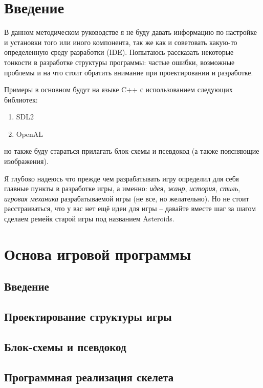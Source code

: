 \chapter{Введение} %

В данном методическом руководстве я не буду давать информацию по настройке и установки того или иного компонента, так же как и советовать какую-то 
определенную среду разработки (IDE). Попытаюсь рассказать некоторые тонкости в разработке структуры программы: частые ошибки, возможные проблемы и на что 
стоит обратить внимание при проектировании и разработке.

Примеры в основном будут на языке C++ с использованием следующих библиотек:
\begin{enumerate}
    \item SDL2
    \item OpenAL
\end{enumerate}
но также буду стараться прилагать блок-схемы и псевдокод (а также поясняющие изображения).

Я глубоко надеюсь что прежде чем разрабатывать игру определил для себя главные пункты в разработке игры, а именно: \emph{идея}, \emph{жанр}, \emph{история}, 
\emph{стиль}, \emph{игровая механика} разрабатываемой игры (не все, но желательно). Но не стоит расстраиваться, что у вас нет ещё идеи для игры -- давайте 
вместе шаг за шагом сделаем ремейк старой игры под названием Asteroids.

\chapter{Основа игровой программы}
\section{Введение}
\section{Проектирование структуры игры}
\section{Блок-схемы и псевдокод}
\section{Программная реализация скелета}
